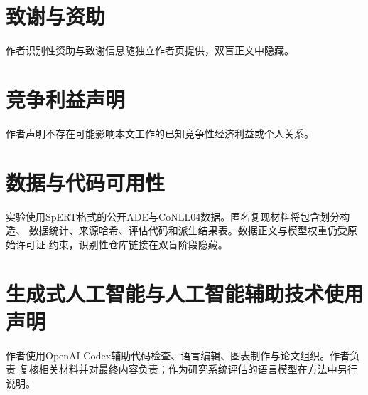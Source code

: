 \documentclass[12pt,a4paper,fontset=none]{ctexart}
\begin{document}
\section*{致谢与资助}
作者识别性资助与致谢信息随独立作者页提供，双盲正文中隐藏。
\section*{竞争利益声明}
作者声明不存在可能影响本文工作的已知竞争性经济利益或个人关系。
\section*{数据与代码可用性}
实验使用SpERT格式的公开ADE与CoNLL04数据。匿名复现材料将包含划分构造、
数据统计、来源哈希、评估代码和派生结果表。数据正文与模型权重仍受原始许可证
约束，识别性仓库链接在双盲阶段隐藏。
\section*{生成式人工智能与人工智能辅助技术使用声明}
作者使用OpenAI Codex辅助代码检查、语言编辑、图表制作与论文组织。作者负责
复核相关材料并对最终内容负责；作为研究系统评估的语言模型在方法中另行说明。

\begingroup\small


\endgroup
\end{document}
